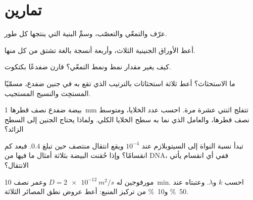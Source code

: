 \section{تمارين}

\begin{exercise}[$\star$]\label{exo:b2:vertebrate-development:1}
عرّف   والتمعّي والتعصّب، وسمِّ
البنية التي ينتجها كل طور.
\end{exercise}

\begin{exercise}[$\star$]\label{exo:b2:vertebrate-development:2}
أعط الأوراق الجنينية الثلاث، وأربعة أنسجة بالغة تشتق من كل
منها.
\end{exercise}

\begin{exercise}[$\star$]\label{exo:b2:vertebrate-development:3}
كيف يغير مقدار  نمط  ونمط
التمعّي؟ قارن ضفدعًا بكتكوت.
\end{exercise}

\begin{exercise}[$\star$]\label{exo:b2:vertebrate-development:4}
ما الاستحثاث؟ أعط ثلاثة استحثاثات بالترتيب الذي تقع به في
جنين ضفدع، مسمّيًا المستحِث والنسيج المستجيب.
\end{exercise}

\begin{exercise}[$\star\star$]\label{exo:b2:vertebrate-development:5}
بيضة ضفدع نصف قطرها \qty{1}{mm} تتفلج اثنتي عشرة مرة. احسب
عدد الخلايا، ومتوسط نصف قطرها، والعامل الذي نما به
سطح الخلايا الكلي. ولماذا يحتاج الجنين إلى السطح الزائد؟
\end{exercise}

\begin{exercise}[$\star\star$]\label{exo:b2:vertebrate-development:6}
تبدأ نسبة النواة إلى السيتوبلازم عند $10^{-4}$ ويقع
انتقال منتصف  حين تبلغ $0.4$. فبعد كم
انقسامًا؟ وإذا حُقنت البيضة بثلاثة أمثال ما فيها
من DNA، ففي أي انقسام يأتي الانتقال؟
\end{exercise}

\begin{exercise}[$\star\star$]\label{exo:b2:vertebrate-development:7}
مورفوجين له $D = \qty{2e-12}{m^2/s}$ وعمر نصف
\qty{10}{min}. احسب $k$ و$\lambda$. وعتبتاه عند
\qty{50}{\%} و\qty{10}{\%} من تركيز المنبع: أعط
عروض نطق المصائر الثلاثة.
\end{exercise}

